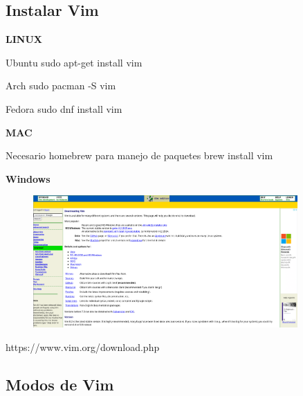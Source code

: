 \documentclass{beamer}
\begin{document}
  \subsection{Instalar Vim}
  \begin{frame}[t]
    \bf{LINUX}
    \begin{block}{Ubuntu}
      sudo apt-get install vim
    \end{block}
    \begin{block}{Arch}
      sudo pacman -S vim
    \end{block}
    \begin{block}{Fedora}
      sudo dnf install vim
    \end{block}
    \vspace{1cm}
    \bf{MAC}
    \begin{block}{Necesario homebrew para manejo de paquetes}
      brew install vim
    \end{block}
  \end{frame}
  \begin{frame}[t]
    \bf{Windows}
    \begin{figure}[h]
      \centering
      \includegraphics[width=0.9\textwidth]{./resources/9.png}
      \label{fig:9}
    \end{figure}
    \vspace{1cm}
    https://www.vim.org/download.php
  \subsection{Modos de Vim}
  \end{frame}
\end{document}
